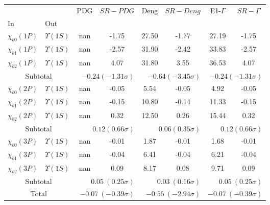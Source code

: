 \begin{tabular}{|l|l|c|c|c|c|c|c|}%
\hline%
&&PDG&$SR-PDG$&Deng&$SR-Deng$&E1-$\Gamma$&$SR-\Gamma$\\%
In&Out&&&&&&\\%
\hline%
$\chi_{b0}(1P)$&$\Upsilon(1S)$&nan&-1.75&27.50&-1.77&27.19&-1.75\\%
$\chi_{b1}(1P)$&$\Upsilon(1S)$&nan&-2.57&31.90&-2.42&33.83&-2.57\\%
$\chi_{b2}(1P)$&$\Upsilon(1S)$&nan&4.07&31.80&3.55&36.53&4.07\\%
\hline%
\hline%
\multicolumn{2}{|c|}{Subtotal}&\multicolumn{2}{|r|}{$-0.24 (-1.31\sigma)$}&\multicolumn{2}{|r|}{$-0.64 (-3.45\sigma)$}&\multicolumn{2}{|r|}{$-0.24 (-1.31\sigma)$}\\%
\hline%
\hline%
$\chi_{b0}(2P)$&$\Upsilon(1S)$&nan&-0.05&5.54&-0.05&4.92&-0.05\\%
$\chi_{b1}(2P)$&$\Upsilon(1S)$&nan&-0.15&10.80&-0.14&11.33&-0.15\\%
$\chi_{b2}(2P)$&$\Upsilon(1S)$&nan&0.32&12.50&0.26&15.44&0.32\\%
\hline%
\hline%
\multicolumn{2}{|c|}{Subtotal}&\multicolumn{2}{|r|}{$0.12 (0.66\sigma)$}&\multicolumn{2}{|r|}{$0.06 (0.35\sigma)$}&\multicolumn{2}{|r|}{$0.12 (0.66\sigma)$}\\%
\hline%
\hline%
$\chi_{b0}(3P)$&$\Upsilon(1S)$&nan&-0.01&1.87&-0.01&1.68&-0.01\\%
$\chi_{b1}(3P)$&$\Upsilon(1S)$&nan&-0.04&6.41&-0.04&6.21&-0.04\\%
$\chi_{b2}(3P)$&$\Upsilon(1S)$&nan&0.09&8.17&0.08&9.71&0.09\\%
\hline%
\hline%
\multicolumn{2}{|c|}{Subtotal}&\multicolumn{2}{|r|}{$0.05~(0.25\sigma)$}&\multicolumn{2}{|r|}{$0.03~(0.16\sigma)$}&\multicolumn{2}{|r|}{$0.05~(0.25\sigma)$}\\%
\hline%
\hline%
\multicolumn{2}{|c|}{Total}&\multicolumn{2}{|r|}{$-0.07~(-0.39\sigma)$}&\multicolumn{2}{|r|}{$-0.55~(-2.94\sigma)$}&\multicolumn{2}{|r|}{$-0.07~(-0.39\sigma)$}\\%
\hline%
\end{tabular}